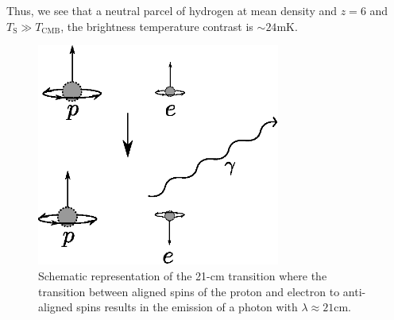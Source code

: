 Thus, we see that a neutral parcel of hydrogen at mean density and $z = 6$ and $T_{\text{S}} \gg T_{\text{CMB}}$, the brightness temperature contrast is $\sim 24\text{mK}$. 


\begin{figure}[h]
  \centering
  \includegraphics[width=8cm]{21cmline.eps}
  \caption{Schematic representation of the 21-cm transition where the transition between aligned spins of the proton and electron to anti-aligned spins results in the emission of a photon with $\lambda \approx 21$cm. }
  \label{fig:21cmline}
\end{figure}

